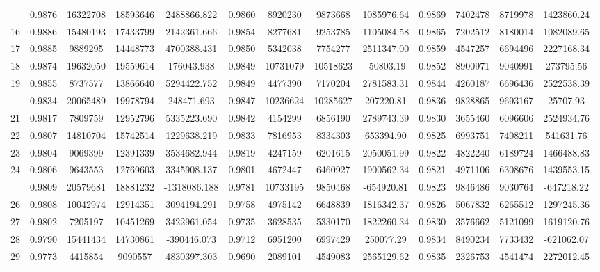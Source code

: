 \documentclass[
  12pt,
]{article}
\begin{document}
\begin{longtable}[t]{lcccccccccccc}
\addlinespace
15 & 0.9876 & 16322708 & 18593646 & 2488866.822 & 0.9860 & 8920230 & 9873668 & 1085976.64 & 0.9869 & 7402478 & 8719978 & 1423860.24\\
16 & 0.9886 & 15480193 & 17433799 & 2142361.666 & 0.9854 & 8277681 & 9253785 & 1105084.58 & 0.9865 & 7202512 & 8180014 & 1082089.65\\
17 & 0.9885 & 9889295 & 14448773 & 4700388.431 & 0.9850 & 5342038 & 7754277 & 2511347.00 & 0.9859 & 4547257 & 6694496 & 2227168.34\\
18 & 0.9874 & 19632050 & 19559614 & 176043.938 & 0.9849 & 10731079 & 10518623 & -50803.19 & 0.9852 & 8900971 & 9040991 & 273795.56\\
19 & 0.9855 & 8737577 & 13866640 & 5294422.752 & 0.9849 & 4477390 & 7170204 & 2781583.31 & 0.9844 & 4260187 & 6696436 & 2522538.39\\
\addlinespace
20 & 0.9834 & 20065489 & 19978794 & 248471.693 & 0.9847 & 10236624 & 10285627 & 207220.81 & 0.9836 & 9828865 & 9693167 & 25707.93\\
21 & 0.9817 & 7809759 & 12952796 & 5335223.690 & 0.9842 & 4154299 & 6856190 & 2789743.39 & 0.9830 & 3655460 & 6096606 & 2524934.76\\
22 & 0.9807 & 14810704 & 15742514 & 1229638.219 & 0.9833 & 7816953 & 8334303 & 653394.90 & 0.9825 & 6993751 & 7408211 & 541631.76\\
23 & 0.9804 & 9069399 & 12391339 & 3534682.944 & 0.9819 & 4247159 & 6201615 & 2050051.99 & 0.9822 & 4822240 & 6189724 & 1466488.83\\
24 & 0.9806 & 9643553 & 12769603 & 3345908.137 & 0.9801 & 4672447 & 6460927 & 1900562.34 & 0.9821 & 4971106 & 6308676 & 1439553.15\\
\addlinespace
25 & 0.9809 & 20579681 & 18881232 & -1318086.188 & 0.9781 & 10733195 & 9850468 & -654920.81 & 0.9823 & 9846486 & 9030764 & -647218.22\\
26 & 0.9808 & 10042974 & 12914351 & 3094194.291 & 0.9758 & 4975142 & 6648839 & 1816342.37 & 0.9826 & 5067832 & 6265512 & 1297245.36\\
27 & 0.9802 & 7205197 & 10451269 & 3422961.054 & 0.9735 & 3628535 & 5330170 & 1822260.34 & 0.9830 & 3576662 & 5121099 & 1619120.76\\
28 & 0.9790 & 15441434 & 14730861 & -390446.073 & 0.9712 & 6951200 & 6997429 & 250077.29 & 0.9834 & 8490234 & 7733432 & -621062.07\\
29 & 0.9773 & 4415854 & 9090557 & 4830397.303 & 0.9690 & 2089101 & 4549083 & 2565129.62 & 0.9835 & 2326753 & 4541474 & 2272012.45\\

\end{longtable}
\end{document}
